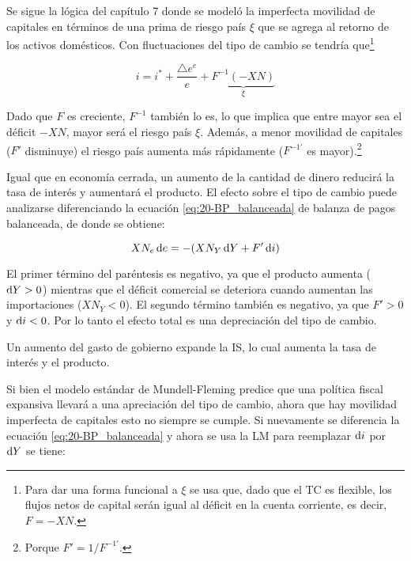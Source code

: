 \documentclass[DeGregorioResumen]{subfiles}
\begin{document}
Se sigue la lógica del capítulo 7 donde se modeló la imperfecta movilidad de capitales en términos de una prima de riesgo país $\xi$ que se agrega al retorno de los activos domésticos. Con fluctuaciones del tipo de cambio se tendría que\footnote{Para dar una forma funcional a $\xi$ se usa que, dado que el TC es flexible, los flujos netos de capital serán igual al déficit en la cuenta corriente, es decir, $F=-XN$.}

\begin{equation}
	i = i^* + \frac{\bigtriangleup e^e}{e} + \underbrace{F^{-1}(-XN)}_{\xi}
	\label{eq:20-tasa_dinamicaTC_riesgo}
\end{equation}

Dado que $F$ es creciente, $F^{-1}$ también lo es, lo que implica que entre mayor sea el déficit $-XN$, mayor será el riesgo país $\xi$. Además, a menor movilidad de capitales ($F'$ disminuye) el riesgo país aumenta más rápidamente ($F^{-1'}$ es mayor).\footnote{Porque $F'=1/F^{-1'}$.}


Igual que en economía cerrada, un aumento de la cantidad de dinero reducirá la tasa de interés y aumentará el producto. El efecto sobre el tipo de cambio puede analizarse diferenciando la ecuación \eqref{eq:20-BP_balanceada} de balanza de pagos balanceada, de donde se obtiene:

\begin{equation*}
	XN_e\mathop{}\!\mathrm{d} e = - (XN_Y \mathop{}\!\mathrm{d} Y + F' \mathop{}\!\mathrm{d} i)
\end{equation*}

El primer término del paréntesis es negativo, ya que el producto aumenta ($\mathop{}\!\mathrm{d} Y>0$) mientras que el déficit comercial se deteriora cuando aumentan las importaciones ($XN_Y<0$). El segundo término también es negativo, ya que $F'>0$ y $\mathop{}\!\mathrm{d} i<0$. Por lo tanto el efecto total es una depreciación del tipo de cambio.


Un aumento del gasto de gobierno expande la IS, lo cual aumenta la tasa de interés y el producto.

Si bien el modelo estándar de Mundell-Fleming predice que una política fiscal expansiva llevará a una apreciación del tipo de cambio, ahora que hay movilidad imperfecta de capitales esto no siempre se cumple. Si nuevamente se diferencia la ecuación \eqref{eq:20-BP_balanceada} y ahora se usa la LM para reemplazar $\mathop{}\!\mathrm{d} i$ por $\mathop{}\!\mathrm{d} Y$ se tiene:
\end{document}
